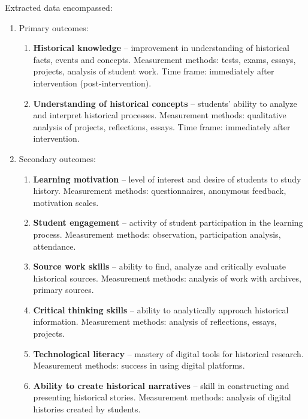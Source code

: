 \documentclass[
hf,
]{ceurart}
\begin{document}
Extracted data encompassed:

\begin{enumerate}
    \item  {Primary outcomes:}

\begin{enumerate}
    \item \textbf{Historical knowledge} -- improvement in understanding of historical facts, events and concepts. Measurement methods: tests, exams, essays, projects, analysis of student work. Time frame: immediately after intervention (post-intervention).
    
    \item \textbf{Understanding of historical concepts} -- students' ability to analyze and interpret historical processes. Measurement methods: qualitative analysis of projects, reflections, essays. Time frame: immediately after intervention.
\end{enumerate}

\item {Secondary outcomes:}
\begin{enumerate}
    \item \textbf{Learning motivation} -- level of interest and desire of students to study history. Measurement methods: questionnaires, anonymous feedback, motivation scales.
    
    \item \textbf{Student engagement} -- activity of student participation in the learning process. Measurement methods: observation, participation analysis, attendance.
    
    \item \textbf{Source work skills} -- ability to find, analyze and critically evaluate historical sources. Measurement methods: analysis of work with archives, primary sources.
    
    \item \textbf{Critical thinking skills} -- ability to analytically approach historical information. Measurement methods: analysis of reflections, essays, projects.
    
    \item \textbf{Technological literacy} -- mastery of digital tools for historical research. Measurement methods: success in using digital platforms.
    
    \item \textbf{Ability to create historical narratives} -- skill in constructing and presenting historical stories. Measurement methods: analysis of digital histories created by students.
\end{enumerate}
\end{enumerate}
\end{document}
